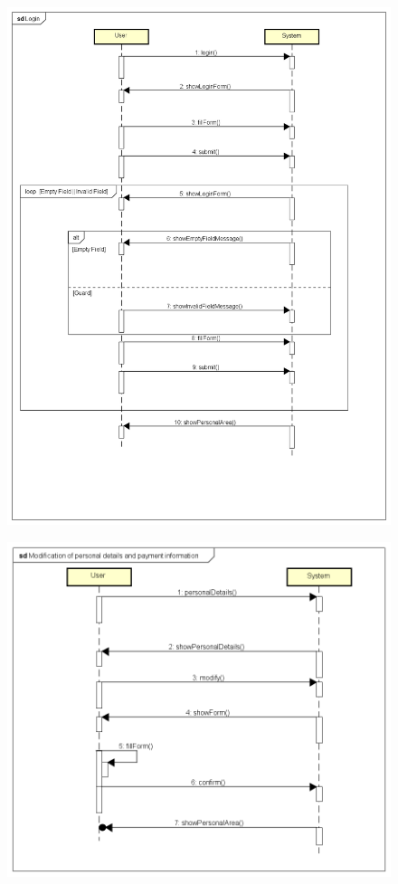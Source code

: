 \begin{figure}[H]
	\includegraphics[width = \textwidth]{img/sequence2}
\end{figure}


\begin{figure}[H]
	\includegraphics[width = \textwidth]{img/sequence3}
\end{figure}


